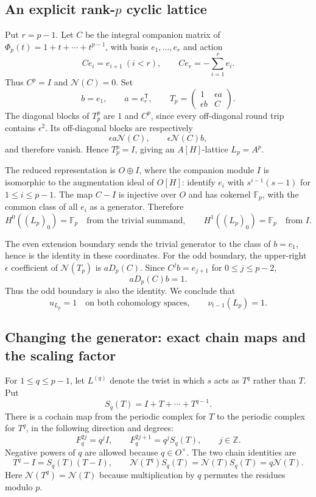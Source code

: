 \subsection{An explicit rank-\texorpdfstring{$p$}{p} cyclic lattice}

Put $r=p-1$.  Let $C$ be the integral companion matrix of
$\Phi_p(t)=1+t+\cdots+t^{p-1}$, with basis $e_1,\ldots,e_r$ and action
\[
 Ce_i=e_{i+1}\ (i<r),\qquad
 Ce_r=-\sum_{i=1}^r e_i.
\]
Thus $C^p=I$ and $\mathcal N(C)=0$.  Set
\[
 b=e_1,\qquad a=e_r^{\mathsf T},\qquad
 T_p=\begin{pmatrix}1&\epsilon a\\\epsilon b&C\end{pmatrix}.
\]
The diagonal blocks of $T_p^p$ are $1$ and $C^p$, since every off-diagonal
round trip contains $\epsilon^2$.  Its off-diagonal blocks are respectively
\[
 \epsilon a\mathcal N(C),\qquad
 \epsilon\mathcal N(C)b,
\]
and therefore vanish.  Hence $T_p^p=I$, giving an $A[H]$-lattice
$L_p=A^p$.

The reduced representation is $O\oplus I$, where the companion module $I$
is isomorphic to the augmentation ideal of $O[H]$: identify $e_i$ with
$s^{i-1}(s-1)$ for $1\le i\le p-1$.  The map $C-I$ is injective over $O$
and has cokernel $\mathbb F_p$, with the common class of all $e_i$ as a
generator.  Therefore
\[
 H^0((L_p)_0)=\mathbb F_p\quad\text{from the trivial summand},
 \qquad
 H^1((L_p)_0)=\mathbb F_p\quad\text{from }I.
\]

The even extension boundary sends the trivial generator to the class of
$b=e_1$, hence is the identity in these coordinates.  For the odd boundary,
the upper-right $\epsilon$ coefficient of $\mathcal N(T_p)$ is
$aD_p(C)$.  Since $C^jb=e_{j+1}$ for $0\le j\le p-2$,
\[
 aD_p(C)b=1.
\]
Thus the odd boundary is also the identity.  We conclude that
\begin{equation}
\label{eq:dual-prime-u-one}
 u_{L_p}=1\quad\text{on both cohomology spaces},\qquad
 \nu_{t-1}(L_p)=1.
\end{equation}

\subsection{Changing the generator: exact chain maps and the scaling factor}

For $1\le q\le p-1$, let $L^{(q)}$ denote the twist in which $s$ acts as
$T^q$ rather than $T$.  Put
\[
 S_q(T)=I+T+\cdots+T^{q-1}.
\]
There is a cochain map from the periodic complex for $T$ to the periodic
complex for $T^q$, in the following direction and degrees:
\begin{equation}
\label{eq:dual-prime-comparison}
 F_q^{2j}=q^j I,\qquad
 F_q^{2j+1}=q^j S_q(T),\qquad j\in\mathbb Z.
\end{equation}
Negative powers of $q$ are allowed because $q\in O^\times$.  The two chain
identities are
\[
 T^q-I=S_q(T)(T-I),\qquad
 \mathcal N(T^q)S_q(T)=\mathcal N(T)S_q(T)=q\mathcal N(T).
\]
Here $\mathcal N(T^q)=\mathcal N(T)$ because multiplication by $q$ permutes
the residues modulo $p$.

